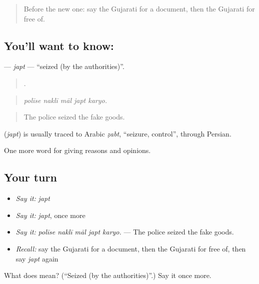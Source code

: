 \label{lesson:GU-C350-japt}



\begin{quote}
Before the new one: say the Gujarati for a document, then the Gujarati for free of.
\end{quote}

\subsection*{You'll want to know: }
\textbf{} — \emph{japt} — \textquotedblleft{}seized (by the authorities)\textquotedblright{}.

\begin{quote}
    .
\end{quote}

\begin{quote}
\emph{polīse naklī māl japt karyo.}
\end{quote}

\begin{quote}
The police seized the fake goods.
\end{quote}

\begin{cousinweb}
\textbf{} (\emph{japt}) is usually traced to Arabic \emph{ẓabt}, \textquotedblleft{}seizure, control\textquotedblright{}, through Persian.
\end{cousinweb}

\begin{grammarlens}[title={What you've built}]
One more word for giving reasons and opinions.
\end{grammarlens}

\subsection*{Your turn}
\begin{itemize}
\raggedright
  \item \emph{Say it:} \emph{japt}
  \item \emph{Say it:} \emph{japt}, once more
  \item \emph{Say it:} \emph{polīse naklī māl japt karyo.} — The police seized the fake goods.
  \item \emph{Recall:} say the Gujarati for a document, then the Gujarati for free of, then say \emph{japt} again
\end{itemize}

\begin{tcolorbox}[breakable,colback=teal!4,colframe=teal!35!black,title={Before you move on}]
What does  mean? (\textquotedblleft{}Seized (by the authorities)\textquotedblright{}.) Say it once more.
\end{tcolorbox}
